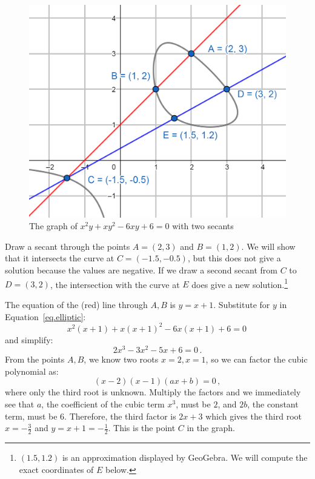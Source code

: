 \documentclass[11pt,a4paper]{article}
\begin{document}
\begin{figure}[H]
\begin{center}
\includegraphics[width=.7\textwidth]{elliptic1}
\end{center}
\caption{The graph of $x^2y + xy^2 -6xy + 6 = 0$ with two secants}\label{fig.elliptic}
\end{figure}

Draw a secant through the points $A=(2,3)$ and $B=(1,2)$. We will show that it intersects the curve at $C=(-1.5,-0.5)$, but this does not give a solution because the values are negative. If we draw a second secant from $C$ to $D=(3,2)$, the intersection with the curve at $E$ does give a new solution.\footnote{$(1.5,1.2)$ is an approximation displayed by GeoGebra. We will compute the exact coordinates of $E$ below.}

The equation of the (red) line through $A,B$ is $y=x+1$. Substitute for $y$ in Equation~\ref{eq.elliptic}:
\[
x^2(x+1) + x(x+1)^2 -6x(x+1) +6 =0\,
\]
and simplify:
\[
2x^3 -3x^2 -5x +6 =0\,.
\]
From the points $A,B$, we know two roots $x=2,x=1$, so we can factor the cubic polynomial as:
\[
(x-2)(x-1)(ax+b)=0\,,
\]
where only the third root is unknown. Multiply the factors and we immediately see that $a$, the coefficient of the cubic term $x^3$, must be $2$, and $2b$, the constant term, must be $6$. Therefore, the third factor is $2x+3$ which gives the third root $x=-\frac{3}{2}$ and $y=x+1=-\frac{1}{2}$. This is the point $C$ in the graph.
\end{document}
